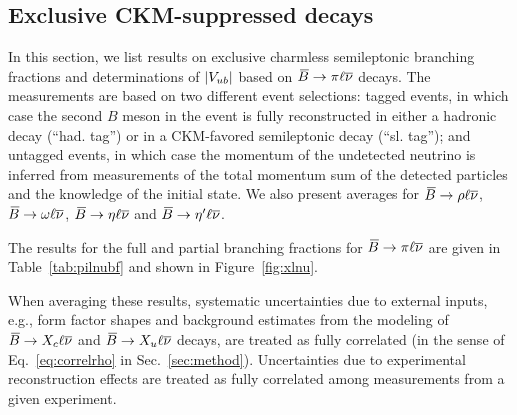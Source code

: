 \subsection{Exclusive CKM-suppressed decays}
\label{slbdecays_b2uexcl}
In this section, we list results on exclusive charmless semileptonic branching fractions
and determinations of $|V_{ub}|$ based on $\kern 0.18em\overline{\kern -0.18em B}{}\to\pi\ell\overline{\nu}$ decays.
The measurements are based on two different event selections: tagged
events, in which case the second $B$ meson in the event is fully
reconstructed in either a hadronic decay (``had. tag'') or in a 
CKM-favored semileptonic decay (``sl. tag''); and untagged events, in which case the momentum
of the undetected neutrino is inferred from measurements of the total 
momentum sum of the detected particles and the knowledge of the initial state.
We also present averages for $\kern 0.18em\overline{\kern -0.18em B}{}\to\rho\ell\overline{\nu}$, $\kern 0.18em\overline{\kern -0.18em B}{}\to\omega\ell\overline{\nu}$, $\kern 0.18em\overline{\kern -0.18em B}{}\to\eta\ell\overline{\nu}$ and
$\kern 0.18em\overline{\kern -0.18em B}{}\to\eta'\ell\overline{\nu}$.

The results for the full and partial branching fractions for $\kern 0.18em\overline{\kern -0.18em B}{}\to\pi\ell\overline{\nu}$ are given
in Table~\ref{tab:pilnubf} and shown in Figure~\ref{fig:xlnu}.   

When averaging these results, systematic uncertainties due to external
inputs, e.g., form factor shapes and background estimates from the
modeling of $\kern 0.18em\overline{\kern -0.18em B}{}\to X_c\ell\overline{\nu}$ and $\kern 0.18em\overline{\kern -0.18em B}{}\to X_u\ell\overline{\nu}$ decays, are
treated as fully correlated (in the sense of Eq.~\ref{eq:correlrho} in
Sec.~\ref{sec:method}).
Uncertainties due to experimental reconstruction effects are treated
as fully correlated among measurements from a given experiment.



